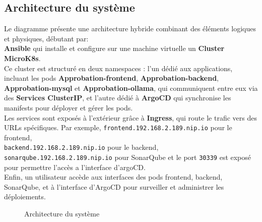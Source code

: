 \subsection{Architecture du système}
Le diagramme présente une architecture hybride combinant des éléments logiques et physiques, débutant par: \\
\textbf{Ansible} qui installe et configure sur une machine virtuelle un \textbf{Cluster MicroK8s}.\\
Ce cluster est structuré en deux namespaces : l’un dédié aux applications, incluant les pods \textbf{Approbation-frontend}, \textbf{Approbation-backend}, \textbf{Approbation-mysql} et \textbf{Approbation-ollama}, qui communiquent entre eux via des \textbf{Services ClusterIP}, et l’autre dédié à \textbf{ArgoCD} qui synchronise les manifests pour déployer et gérer les pods.\\
Les services sont exposés à l’extérieur grâce à \textbf{Ingress}, qui route le trafic vers des URLs spécifiques. Par exemple, \texttt{frontend.192.168.2.189.nip.io} pour le frontend,\\
\texttt{backend.192.168.2.189.nip.io} pour le backend,\\
\texttt{sonarqube.192.168.2.189.nip.io} pour SonarQube et le port \texttt{30339} est exposé pour permettre l'accès a l'interface d'argoCD.\\
Enfin, un utilisateur accède aux interfaces des pods frontend, backend, SonarQube, et à l’interface d’ArgoCD pour surveiller et administrer les déploiements.
\newpage
\begin{figure}[h]
      \begin{adjustwidth}{-3.5cm}{-3.5cm}
      \centering
      \caption{Architecture du système}
      \label{fig:sysarch}
      \end{adjustwidth}
  \end{figure}

